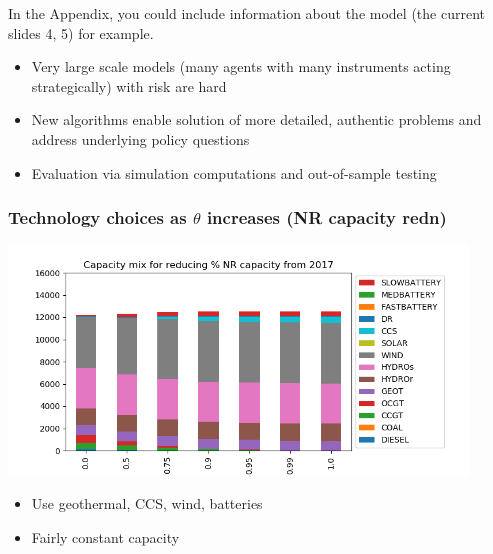 \documentclass[xcolor=dvipsnames]{beamer}
\begin{document}
\appendix

\begin{frame}
In the Appendix, you could include information about the model (the
current slides 4, 5) for example.
\begin{itemize}
  \item \color{black} Very large scale models (many agents with many instruments
    acting strategically) with risk are hard
  \item \alert{New algorithms enable solution of more detailed,
      authentic problems and address underlying policy questions}
  \item Evaluation via simulation computations and out-of-sample testing
\end{itemize}
\end{frame}


\begin{frame}
  \frametitle{Technology choices as $\theta$ increases (NR capacity redn)}

  \includegraphics[width=4.8in]{includes/Scaprednv20.png} \\
  \begin{itemize}
  \item Use geothermal, CCS, wind, batteries
  \item Fairly constant capacity
  \end{itemize}
\end{frame}
\end{document}
